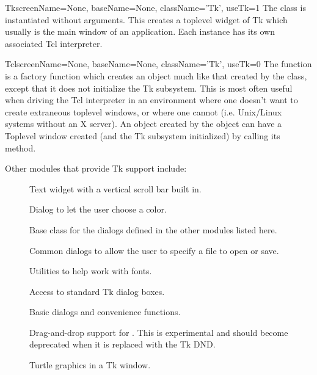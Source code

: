 \begin{classdesc}{Tk}{screenName=None, baseName=None, className='Tk', useTk=1}
The  class is instantiated without arguments.
This creates a toplevel widget of Tk which usually is the main window
of an application. Each instance has its own associated Tcl interpreter.
\end{classdesc}

\begin{funcdesc}{Tcl}{screenName=None, baseName=None, className='Tk', useTk=0}
The  function is a factory function which creates an object
much like that created by the  class, except that it does not
initialize the Tk subsystem.  This is most often useful when driving the Tcl
interpreter in an environment where one doesn't want to create extraneous
toplevel windows, or where one cannot (i.e. Unix/Linux systems without an X
server).  An object created by the  object can have a Toplevel
window created (and the Tk subsystem initialized) by calling its
 method.
\end{funcdesc}

Other modules that provide Tk support include:

\begin{description}

\item[]
Text widget with a vertical scroll bar built in.

\item[]
Dialog to let the user choose a color.

\item[]
Base class for the dialogs defined in the other modules listed here.

\item[]
Common dialogs to allow the user to specify a file to open or save.

\item[]
Utilities to help work with fonts.

\item[]
Access to standard Tk dialog boxes.

\item[]
Basic dialogs and convenience functions.

\item[]
Drag-and-drop support for .
This is experimental and should become deprecated when it is replaced 
with the Tk DND.

\item[]
Turtle graphics in a Tk window.

\end{description}

